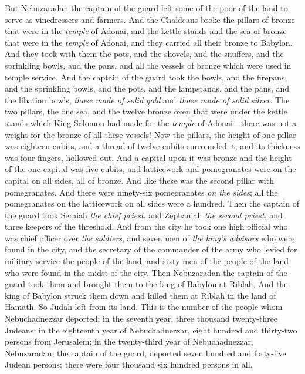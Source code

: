 \begin{biblechapter}
\verse But Nebuzaradan the captain of the guard left some of the poor of the land to serve as vinedressers and farmers.
\verse And the Chaldeans broke the pillars of bronze that were in the \textit{temple} of Adonai, and the kettle stands and the sea of bronze that were in the \textit{temple} of Adonai, and they carried all their bronze to Babylon.
\verse And they took with them the pots, and the shovels, and the snuffers, and the sprinkling bowls, and the pans, and all the vessels of bronze which were used in temple service.
\verse And the captain of the guard took the bowls, and the firepans, and the sprinkling bowls, and the pots, and the lampstands, and the pans, and the libation bowls, \textit{those made of solid gold} and \textit{those made of solid silver}.
\verse The two pillars, the one sea, and the twelve bronze oxen that were under the kettle stands which King Solomon had made for the \textit{temple} of Adonai—there was not a weight for the bronze of all these vessels!
\verse Now the pillars, the height of one pillar was eighteen cubits, and a thread of twelve cubits surrounded it, and its thickness was four fingers, hollowed out.
\verse And a capital upon it was bronze and the height of the one capital was five cubits, and latticework and pomegranates were on the capital on all sides, all of bronze. And like these was the second pillar with pomegranates.
\verse And there were ninety-six pomegranates \textit{on the sides}; all the pomegranates on the latticework on all sides were a hundred.
\verse Then the captain of the guard took Seraiah \textit{the chief priest}, and Zephaniah \textit{the second priest}, and three keepers of the threshold.
\verse And from the city he took one high official who was chief officer over \textit{the soldiers}, and seven men of \textit{the king’s advisors} who were found in the city, and the secretary of the commander of the army who levied for military service the people of the land, and sixty men of the people of the land who were found in the midst of the city.
\verse Then Nebuzaradan the captain of the guard took them and brought them to the king of Babylon at Riblah.
\verse And the king of Babylon struck them down and killed them at Riblah in the land of Hamath. So Judah left from its land.
\verse This is the number of the people whom Nebuchadnezzar deported: in the seventh year, three thousand twenty-three Judeans;
\verse in the eighteenth year of Nebuchadnezzar, eight hundred and thirty-two persons from Jerusalem;
\verse in the twenty-third year of Nebuchadnezzar, Nebuzaradan, the captain of the guard, deported seven hundred and forty-five Judean persons; there were four thousand six hundred persons in all.

\end{biblechapter}
